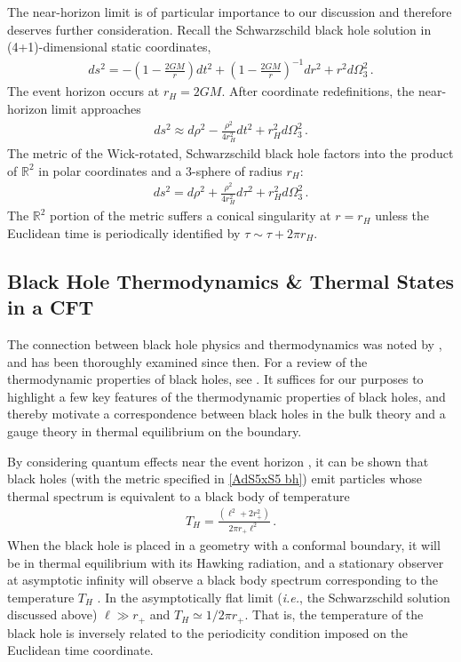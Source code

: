 \documentclass[../PhD.tex]{subfiles}
\begin{document}
The near-horizon limit is of particular importance to our discussion and therefore deserves further consideration. Recall the Schwarzschild black hole solution in (4+1)-dimensional static coordinates,
\begin{align}
ds^2 = -\left( 1 - \frac{2GM}{r} \right) dt^2 + \left(1- \frac{2GM}{r}\right)^{-1} dr^2 + r^2 d\Omega_3^2 \, .
\end{align}
The event horizon occurs at $r_H = 2GM$. After coordinate redefinitions, the near-horizon limit approaches
\begin{align}
ds^2 \approx d\rho^2 - \frac{\rho^2}{4r_H^2}dt^2 + r_H^2 d\Omega_3^2 \, .
\end{align}
The metric of the Wick-rotated, Schwarzschild black hole factors into the product of $\mathbb R^2$ in polar coordinates and a 3-sphere of radius $r_H$:
\begin{align}
\label{near-horizon thermal bh}
ds^2 = d\rho^2 + \frac{\rho^2}{4r_H^2} d\tau^2 + r_H^2 d\Omega^2_3 \, .
\end{align}
The $\mathbb R^2$ portion of the metric suffers a conical singularity at $r=r_H$ unless the Euclidean time is periodically identified by $\tau \sim \tau + 2\pi r_H$.


\subsection{Black Hole Thermodynamics \& Thermal States in a CFT}
\label{sub: bh thermo}

The connection between black hole physics and thermodynamics was noted by \cite{Bekenstein:1973ur}, and has been thoroughly examined since then. For a review of the thermodynamic properties of black holes, see \cite{Jacobson1996, Bardeen:1973gs, Hawking:1982dh}. It suffices for our purposes to highlight a few key features of the thermodynamic properties of black holes, and thereby motivate a correspondence between black holes in the bulk theory and a gauge theory in thermal equilibrium on the boundary.

By considering quantum effects near the event horizon \cite{Hawking:1974rv}, it can be shown that black holes (with the metric specified in \eqref{AdS5xS5 bh}) emit particles whose thermal spectrum is equivalent to a black body of temperature \cite{Hawking:1974sw}
\begin{align}
\label{hawking temp}
T_H = \frac{(\ell^2 + 2r_+^2)}{2 \pi r_+ \ell^2} \, .
\end{align}
When the black hole is placed in a geometry with a conformal boundary, it will be in thermal equilibrium with its Hawking radiation, and a stationary observer at asymptotic infinity will observe a black body spectrum corresponding to the temperature $T_H$ \cite{Carroll:2004st}. In the asymptotically flat limit ({\it i.e.}, the Schwarzschild solution discussed above) $\ell \gg r_+$ and $T_H \simeq 1/2\pi r_+$. That is, the temperature of the black hole is inversely related to the periodicity condition imposed on the Euclidean time coordinate.
\end{document}
